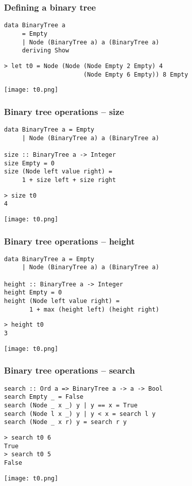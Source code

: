 \documentclass[14pt,t,usepdftitle=false,
xcolornames=x11names,svgnames,dvipsnames]{beamer}
\begin{document}
\begin{frame}
  \frametitle{Defining a binary tree}
\begin{lstlisting}
data BinaryTree a
     = Empty
     | Node (BinaryTree a) a (BinaryTree a)
     deriving Show
\end{lstlisting}
\begin{lstlisting}[style=repl]
> let t0 = Node (Node (Node Empty 2 Empty) 4
                      (Node Empty 6 Empty)) 8 Empty
\end{lstlisting}
  \texttt{[image: t0.png]}
\end{frame}

\begin{frame}
  \frametitle{Binary tree operations -- size}
\begin{lstlisting}
data BinaryTree a = Empty
     | Node (BinaryTree a) a (BinaryTree a)

size :: BinaryTree a -> Integer
size Empty = 0
size (Node left value right) =
     1 + size left + size right
\end{lstlisting}
\begin{lstlisting}[style=repl]
> size t0
4
\end{lstlisting}
    \texttt{[image: t0.png]}
\end{frame}

\begin{frame}
  \frametitle{Binary tree operations -- height}
\begin{lstlisting}
data BinaryTree a = Empty
     | Node (BinaryTree a) a (BinaryTree a)

height :: BinaryTree a -> Integer
height Empty = 0
height (Node left value right) =
       1 + max (height left) (height right)
\end{lstlisting}
\begin{lstlisting}[style=repl]
> height t0
3
\end{lstlisting}
    \texttt{[image: t0.png]}
\end{frame}

\begin{frame}
  \frametitle{Binary tree operations -- search}
\begin{lstlisting}
search :: Ord a => BinaryTree a -> a -> Bool
search Empty _ = False
search (Node _ x _) y | y == x = True
search (Node l x _) y | y < x = search l y
search (Node _ x r) y = search r y
\end{lstlisting}
\begin{lstlisting}[style=repl]
> search t0 6
True
> search t0 5
False
\end{lstlisting}
    \texttt{[image: t0.png]}
\end{frame}
\end{document}

